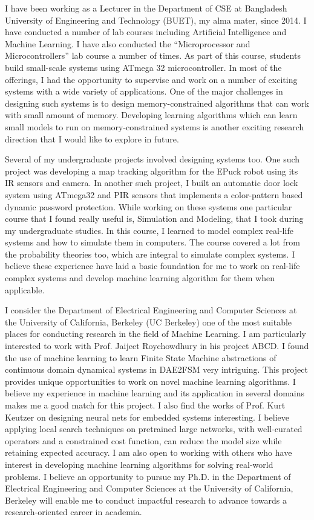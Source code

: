 \documentclass[12pt]{article}
\begin{document}
I have been working as a Lecturer in the Department of CSE at Bangladesh University of Engineering and Technology (BUET), my alma mater, since 2014. I have conducted a number of lab courses including Artificial Intelligence and Machine Learning. I have also conducted the ``Microprocessor and Microcontrollers'' lab course a number of times. As part of this course, students build small-scale systems using ATmega 32 microcontroller. In most of the offerings, I had the opportunity to supervise and work on a number of exciting systems with a wide variety of applications. One of the major challenges in designing such systems is to design memory-constrained algorithms that can work with small amount of memory. Developing learning algorithms which can learn small models to run on memory-constrained systems is another exciting research direction that I would like to explore in future. 

Several of my undergraduate projects involved designing systems too. One such project was developing a map tracking algorithm for the EPuck robot using its IR sensors and camera. In another such project, I built an automatic door lock system using ATmega32 and PIR sensors that implements a color-pattern based dynamic password protection. While working on these systems one particular course that I found really useful is, Simulation and Modeling, that I took during my undergraduate studies. In this course, I learned to model complex real-life systems and how to simulate them in computers. The course covered a lot from the probability theories too, which are integral to simulate complex systems. I believe these experience have laid a basic foundation for me to work on real-life complex systems and develop machine learning algorithm for them when applicable. 

I consider the Department of Electrical Engineering and Computer Sciences at the University of California, Berkeley (UC Berkeley) one of the most suitable places for conducting research in the field of Machine Learning. I am particularly interested to work with Prof. Jaijeet Roychowdhury in his project ABCD. I found the use of machine learning to learn Finite State Machine abstractions of continuous domain dynamical systems in DAE2FSM very intriguing. This project provides unique opportunities to work on novel machine learning algorithms. I believe my experience in machine learning and its application in several domains makes me a good match for this project. I also find the works of Prof. Kurt Keutzer on designing neural nets for embedded systems interesting. I believe applying local search techniques on pretrained large networks, with well-curated operators and a constrained cost function, can reduce the model size while retaining expected accuracy. I am also open to working with others who have interest in developing machine learning algorithms for solving real-world problems. I believe an opportunity to pursue my Ph.D. in the Department of Electrical Engineering and Computer Sciences at the University of California, Berkeley will enable me to conduct impactful research to advance towards a research-oriented career in academia. 
\end{document}
